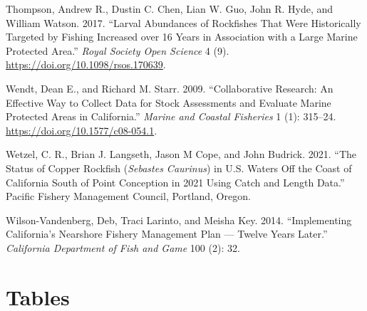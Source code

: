 \documentclass[11pt,
  english,
  letterpaper,
]{article}
\newlength{\cslhangindent}
\newenvironment{CSLReferences}[2] %
 {%
  \setlength{\parindent}{0pt}
  \ifodd #1 \everypar{\setlength{\hangindent}{\cslhangindent}}\ignorespaces\fi
  \ifnum #2 > 0
  \setlength{\parskip}{#2\baselineskip}
  \fi
 }%
 {}
\begin{document}
\begin{CSLReferences}{1}{0}
\leavevmode{}%
Thompson, Andrew R., Dustin C. Chen, Lian W. Guo, John R. Hyde, and William Watson. 2017. {``Larval Abundances of Rockfishes That Were Historically Targeted by Fishing Increased over 16 Years in Association with a Large Marine Protected Area.''} \emph{Royal Society Open Science} 4 (9). \url{https://doi.org/10.1098/rsos.170639}.

\leavevmode{}%
Wendt, Dean E., and Richard M. Starr. 2009. {``Collaborative Research: An Effective Way to Collect Data for Stock Assessments and Evaluate Marine Protected Areas in {California}.''} \emph{Marine and Coastal Fisheries} 1 (1): 315--24. \url{https://doi.org/10.1577/c08-054.1}.

\leavevmode{}%
Wetzel, C. R., Brian J. Langseth, Jason M Cope, and John Budrick. 2021. {``The Status of Copper Rockfish (\emph{{Sebastes} Caurinus}) in {U}.{S}. Waters Off the Coast of {California} South of {Point} {Conception} in 2021 Using Catch and Length Data.''} Pacific Fishery Management Council, Portland, Oregon.

\leavevmode{}%
Wilson-Vandenberg, Deb, Traci Larinto, and Meisha Key. 2014. {``Implementing {California}'s {Nearshore} {Fishery} {Management} {Plan} --- Twelve Years Later.''} \emph{California Department of Fish and Game} 100 (2): 32.

\end{CSLReferences}

\clearpage

\hypertarget{tables}{%
\section{Tables}\label{tables}}

\begingroup\fontsize{10}{12}\selectfont
\begingroup\fontsize{10}{12}\selectfont
\end{document}
